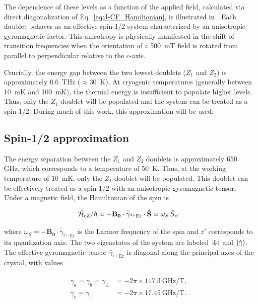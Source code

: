 The dependence of these levels as a function of the applied field, calculated via direct diagonalization of Eq.~\ref{eq:J-CF_Hamiltonian}, is illustrated in . Each doublet behaves as an effective spin-1/2 system characterized by an anisotropic gyromagnetic factor. This anisotropy is physically manifested in the shift of transition frequencies when the orientation of a 500~mT field is rotated from parallel to perpendicular relative to the $c$-axis. 

Crucially, the energy gap between the two lowest doublets ($Z_1$ and $Z_2$) is approximately 0.6~THz ($\approx 30$~K). At cryogenic temperatures (generally between 10~mK and 100~mK), the thermal energy is insufficient to populate higher levels. Thus, only the $Z_1$ doublet will be populated and the system can be treated as a spin-1/2. During much of this work, this approximation will be used.

\subsection{Spin-1/2 approximation}

The energy separation between the $Z_1$ and $Z_2$ doublets is approximately 650 GHz, which corresponds to a temperature of 50~K. Thus, at the working temperature of 10~mK, only the $Z_1$ doublet will be populated. This doublet can be effectively treated as a spin-1/2 with an anisotropic gyromagnetic tensor. Under a magnetic field, the Hamiltonian of the spin is

\begin{equation}
    \label{eq:er_spin_hamiltonian}
    \hat{\mathcal{H}}_{\text{eZ}} / \hbar = -\mathbf{B_0}\cdot \bar{\bar{\gamma}}_{^{3+}\text{Er}}\cdot\hat{\mathbf{S}} = \omega_S\, \hat{S}_{z'}
\end{equation}

where $\omega_S = -\mathbf{B_0}\cdot \bar{\bar{\gamma}}_{^{3+}\text{Er}}$ is the Larmor frequency of the spin and $z'$ corresponds to its quantization axis. The two eigenstates of the system are labeled $\ket{\Downarrow}$ and $\ket{\Uparrow}$. The effective gyromagnetic tensor $\bar{\bar{\gamma}}_{^{3+}\text{Er}}$ is diagonal along the principal axes of the crystal, with values 

\begin{align}
\begin{split}
    \gamma_a = \gamma_b = \gamma_\perp &= -2\pi \times 117.3~\text{GHz/T}, \\
    \gamma_c = \gamma_\parallel &= -2\pi \times 17.45~\text{GHz/T}.
\end{split}
\label{eq:gyromagnetic_tensor}
\end{align}


